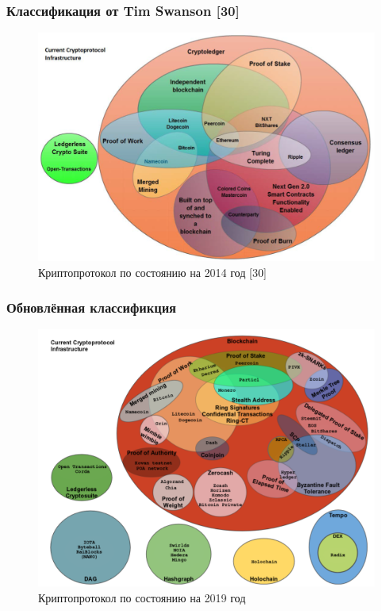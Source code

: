 \documentclass{beamer}
\begin{document}
\begin{frame}
    \frametitle{Классификация от Tim Swanson [30]}
    \begin{figure}
        \includegraphics[width=0.9\columnwidth]{current_protocols}
        \caption{Криптопротокол по состоянию на 2014 год [30]}
    \end{figure}
\end{frame}

\begin{frame}
    \frametitle{Обновлённая классификция}
    \begin{figure}
        \centering
        \includegraphics[width=0.8\columnwidth]{myprotocol_w_title}
        \caption{Криптопротокол по состоянию на 2019 год}
    \end{figure}
\end{frame}
\end{document}

